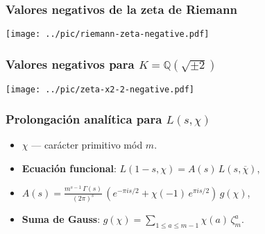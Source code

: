 \documentclass{beamer}
\newcommand{\QQ}{\mathbb{Q}}
\begin{document}

\begin{frame}
  \frametitle{Valores negativos de la zeta de Riemann}

  \begin{center}
    \texttt{[image: ../pic/riemann-zeta-negative.pdf]}
  \end{center}
\end{frame}


\begin{frame}
  \frametitle{Valores negativos para $K = \QQ (\sqrt{\pm 2})$}

  \begin{center}
    \texttt{[image: ../pic/zeta-x2-2-negative.pdf]}
  \end{center}
\end{frame}


\begin{frame}
  \frametitle{Prolongación analítica para $L (s,\chi)$}

  \begin{itemize}
  \item<1-> $\chi$ --- carácter primitivo mód $m$.

  \item<2-> \textbf{Ecuación funcional}: $L (1-s,\chi) = A(s) \, L (s,\overline{\chi})$,

  \item<3-> $A (s) = \frac{m^{s-1}\,\Gamma (s)}{(2\pi)^s} \, \left(e^{-\pi i s/2} + \chi (-1)\,e^{\pi i s/2}\right)\,g (\chi)$,

  \item<4-> \textbf{Suma de Gauss}: $g (\chi) = \sum\limits_{1 \le a \le m-1} \chi (a) \, \zeta_m^a$.
  \end{itemize}
\end{frame}

\end{document}
